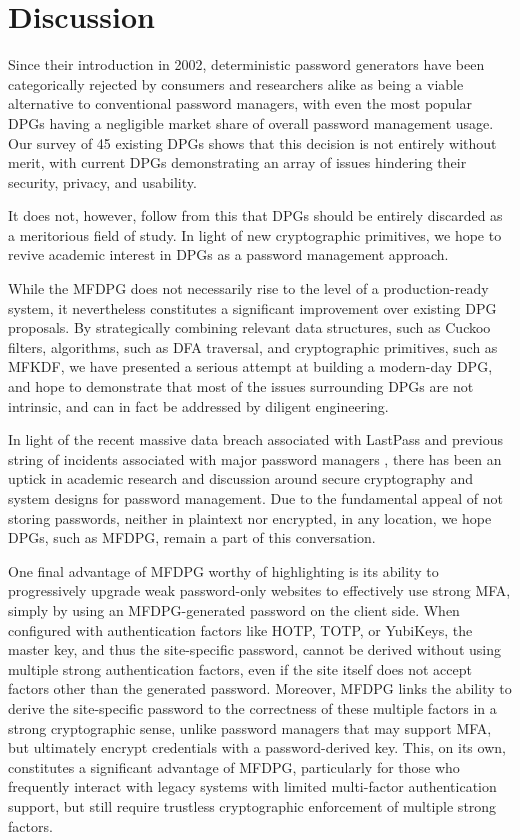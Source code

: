 \section{Discussion}
\label{sec:discussion}

Since their introduction in 2002, deterministic password generators have been categorically rejected by consumers and researchers alike as being a viable alternative to conventional password managers, with even the most popular DPGs having a negligible market share of overall password management usage. Our survey of 45 existing DPGs shows that this decision is not entirely without merit, with current DPGs demonstrating an array of issues hindering their security, privacy, and usability.

It does not, however, follow from this that DPGs should be entirely discarded as a meritorious field of study.
In light of new cryptographic primitives, we hope to revive academic interest in DPGs as a password management approach.

While the MFDPG does not necessarily rise to the level of a production-ready system, it nevertheless constitutes a significant improvement over existing DPG proposals. By strategically combining relevant data structures, such as Cuckoo filters, algorithms, such as DFA traversal, and cryptographic primitives, such as MFKDF, we have presented a serious attempt at building a modern-day DPG, and hope to demonstrate that most of the issues surrounding DPGs are not intrinsic, and can in fact be addressed by diligent engineering.

In light of the recent massive data breach associated with LastPass \cite{toubba_notice_2022} and previous string of incidents associated with major password managers \cite{lastpass_security}, there has been an uptick in academic research and discussion around secure cryptography and system designs for password management. Due to the fundamental appeal of not storing passwords, neither in plaintext nor encrypted, in any location, we hope DPGs, such as MFDPG, remain a part of this conversation.

One final advantage of MFDPG worthy of highlighting is its ability to progressively upgrade weak password-only websites to effectively use strong MFA, simply by using an MFDPG-generated password on the client side. When configured with authentication factors like HOTP, TOTP, or YubiKeys, the master key, and thus the site-specific password, cannot be derived without using multiple strong authentication factors, even if the site itself does not accept factors other than the generated password. Moreover, MFDPG links the ability to derive the site-specific password to the correctness of these multiple factors in a strong cryptographic sense, unlike password managers that may support MFA, but ultimately encrypt credentials with a password-derived key.
This, on its own, constitutes a significant advantage of MFDPG, particularly for those who frequently interact with legacy systems with limited multi-factor authentication support, but still require trustless cryptographic enforcement of multiple strong factors. 

